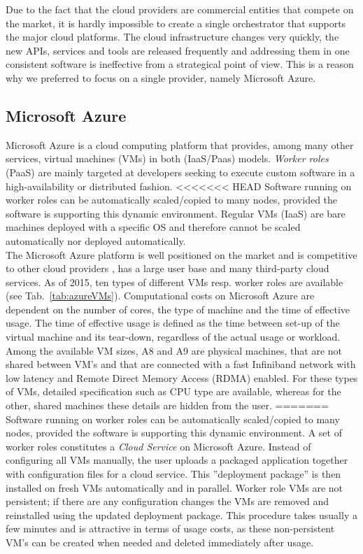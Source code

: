 \documentclass[3p,times]{elsarticle}
\begin{document}
Due to the fact that the cloud providers are commercial entities that compete on the market, it is hardly impossible to create a single orchestrator that supports the major cloud platforms. The cloud infrastructure changes very quickly, the new APIs, services and tools are released frequently and addressing them in one consistent software is ineffective from a strategical point of view. This is a reason why we preferred to focus on a single provider, namely Microsoft Azure.

\subsection{Microsoft Azure}

Microsoft Azure is a cloud computing platform that provides, among many other services, virtual machines (VMs) in both (IaaS/Paas) models. \textit{Worker roles} (PaaS) are mainly targeted at developers seeking to execute custom software in a high-availability or distributed fashion.
<<<<<<< HEAD
Software running on worker roles can be automatically scaled/copied to many nodes, provided the software is supporting this dynamic environment. Regular VMs (IaaS) are bare machines deployed with a specific OS and therefore cannot be scaled automatically nor deployed automatically.\\
The Microsoft Azure platform is well positioned on the market and is competitive to other cloud providers \cite{cloudScores} \cite{twister4azure}, has a large user base and many third-party cloud services. As of 2015, ten types of different VMs resp. worker roles are available (see Tab.~\ref{tab:azureVMs}). Computational costs on Microsoft Azure are dependent on the number of cores, the type of machine and the time of effective usage. The time of effective usage is defined as the time between set-up of the virtual machine and its tear-down, regardless of the actual usage or workload. \\
Among the available VM sizes, A8 and A9 are physical machines, that are not shared between VM's and that are connected with a fast Infiniband network with low latency and Remote Direct Memory Access (RDMA) enabled. For these types of VMs, detailed specification such as CPU type are available, whereas for the other, shared machines these details are hidden from the user. 
=======
Software running on worker roles can be automatically scaled/copied to many nodes, provided the software is supporting this dynamic environment. 
A set of worker roles constitutes a {\it Cloud Service} on Microsoft Azure. Instead of configuring all VMs manually, the user uploads a packaged application together with configuration files for a cloud service. This ''deployment package'' is then installed on fresh VMs automatically and in parallel. Worker role VMs are not persistent; if there are any configuration changes the VMs are removed and reinstalled using the updated deployment package. This procedure takes usually a few minutes and is attractive in terms of usage costs, as these non-persistent VM's can be created when needed and deleted immediately after usage. \\
\end{document}
